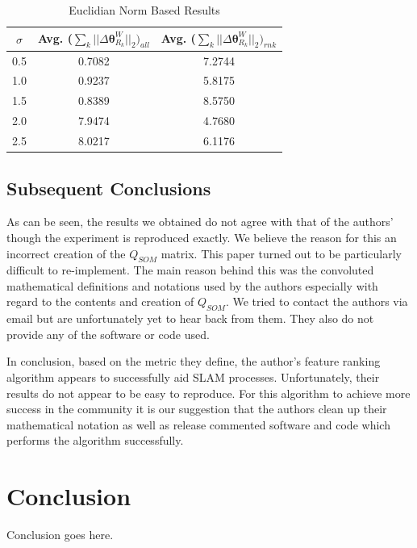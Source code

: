 \documentclass[10pt,twocolumn,letterpaper]{article}
\begin{document}
\begin{table}[t]
\begin{center}
\begin{tabular}{|c|c|c|}
\hline
$\sigma$ & Avg. ($ \sum_k || \Delta \boldsymbol{\theta}_{R_k}^W ||_2)_{all} $ & Avg. ($ \sum_k || \Delta \boldsymbol{\theta}_{R_k}^W ||_2)_{rnk} $  \\
\hline
0.5  & 0.7082  &  7.2744 \\
\hline
1.0  &  0.9237 &  5.8175 \\
\hline
1.5  &  0.8389 &  8.5750 \\
\hline
2.0  &  7.9474 &  4.7680 \\
\hline
2.5  &  8.0217 &  6.1176 \\
\hline
\end{tabular}
\end{center}
\caption{Euclidian Norm Based Results}
\end{table}

\subsection{Subsequent Conclusions}
As can be seen, the results we obtained do not agree with that of the authors' though the experiment is reproduced exactly. We believe the reason for this an incorrect creation of the $Q_{SOM}$ matrix. This paper turned out to be particularly difficult to re-implement. The main reason behind this was the convoluted mathematical definitions and notations used by the authors especially with regard to the contents and creation of $Q_{SOM}$. We tried to contact the authors via email but are unfortunately yet to hear back from them. They also do not provide any of the software or code used.

In conclusion, based on the metric they define, the author's feature ranking algorithm appears to successfully aid SLAM processes. Unfortunately, their results do not appear to be easy to reproduce. For this algorithm to achieve more success in the community it is our suggestion that the authors clean up their mathematical notation as well as release commented software and code which performs the algorithm successfully.    

\section{Conclusion}

Conclusion goes here.
\end{document}
